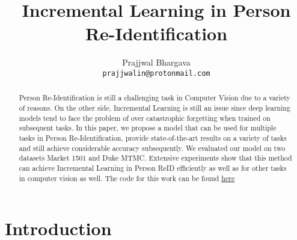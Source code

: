 \documentclass[10pt,twocolumn,letterpaper]{article}
\begin{document}
\title{Incremental Learning in Person Re-Identification}

\author{Prajjwal Bhargava\\
{\tt\small prajjwalin@protonmail.com}
}



\maketitle


\begin{abstract}
   Person Re-Identification is still a challenging task in Computer Vision due to a variety of reasons. On the other side, Incremental Learning is still an issue since deep learning models tend to face the problem of over catastrophic forgetting when trained on subsequent tasks. In this paper, we propose a model that can be used for multiple tasks in Person Re-Identification, provide state-of-the-art results on a variety of tasks and still achieve considerable accuracy subsequently. We evaluated our model on two datasets Market 1501 and Duke MTMC. Extensive experiments show that this method can achieve Incremental Learning in Person ReID efficiently as well as for other tasks in computer vision as well. The code for this work can be found \href{https://github.com/prajjwal1/person-reid-incremental}{here} 
\end{abstract}

\section{Introduction}
\end{document}
